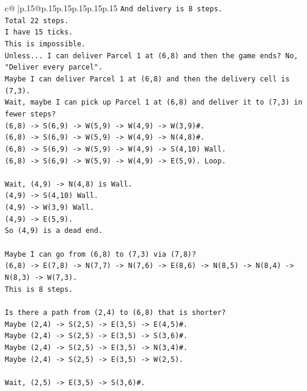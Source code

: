 \documentclass{article}
\begin{document}
{\begin{supertabular}{c@{$\;$}|p{.15\linewidth}@{}p{.15\linewidth}p{.15\linewidth}p{.15\linewidth}p{.15\linewidth}p{.15\linewidth}}
{{{\texttt{And delivery is 8 steps.} \\
\texttt{Total 22 steps.} \\
\texttt{I have 15 ticks.} \\
\texttt{This is impossible.} \\
\texttt{Unless... I can deliver Parcel 1 at (6,8) and then the game ends? No, "Deliver every parcel".} \\
\texttt{Maybe I can deliver Parcel 1 at (6,8) and then the delivery cell is (7,3).} \\
\texttt{Wait, maybe I can pick up Parcel 1 at (6,8) and deliver it to (7,3) in fewer steps?} \\
\texttt{(6,8) {-}> S(6,9) {-}> W(5,9) {-}> W(4,9) {-}> W(3,9)\#.} \\
\texttt{(6,8) {-}> S(6,9) {-}> W(5,9) {-}> W(4,9) {-}> N(4,8)\#.} \\
\texttt{(6,8) {-}> S(6,9) {-}> W(5,9) {-}> W(4,9) {-}> S(4,10) Wall.} \\
\texttt{(6,8) {-}> S(6,9) {-}> W(5,9) {-}> W(4,9) {-}> E(5,9). Loop.} \\
\\ 
\texttt{Wait, (4,9) {-}> N(4,8) is Wall.} \\
\texttt{(4,9) {-}> S(4,10) Wall.} \\
\texttt{(4,9) {-}> W(3,9) Wall.} \\
\texttt{(4,9) {-}> E(5,9).} \\
\texttt{So (4,9) is a dead end.} \\
\\ 
\texttt{Maybe I can go from (6,8) to (7,3) via (7,8)?} \\
\texttt{(6,8) {-}> E(7,8) {-}> N(7,7) {-}> N(7,6) {-}> E(8,6) {-}> N(8,5) {-}> N(8,4) {-}> N(8,3) {-}> W(7,3).} \\
\texttt{This is 8 steps.} \\
\\ 
\texttt{Is there a path from (2,4) to (6,8) that is shorter?} \\
\texttt{Maybe (2,4) {-}> S(2,5) {-}> E(3,5) {-}> E(4,5)\#.} \\
\texttt{Maybe (2,4) {-}> S(2,5) {-}> E(3,5) {-}> S(3,6)\#.} \\
\texttt{Maybe (2,4) {-}> S(2,5) {-}> E(3,5) {-}> N(3,4)\#.} \\
\texttt{Maybe (2,4) {-}> S(2,5) {-}> E(3,5) {-}> W(2,5).} \\
\\ 
\texttt{Wait, (2,5) {-}> E(3,5) {-}> S(3,6)\#.} \\
}}}
\end{supertabular}}
\end{document}
